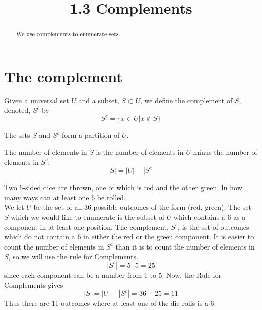 \documentclass[handout]{ximera}
\title{1.3 Complements}
\begin{document}
\begin{abstract}
We use complements to enumerate sets.
\end{abstract}

\maketitle

\section{The complement}



\begin{definition}[Complement]
Given a universal set $U$ and a subset, $S \subset U$, we define the complement of $S$, denoted, $S^c$ by
\[
S^c = \{x \in U | x \notin S \}
\]
\end{definition}

\begin{remark} The sets $S$ and $S^c$ form a partition of $U$.
\end{remark}
\begin{image}
\end{image}

\begin{proposition}
The number of elements in $S$ is the number of elements in $U$ minus the number of elements in $S^c$:
\[
|S| = |U| - |S^c|
\]
\end{proposition}



\begin{example}[example 1]
Two 6-sided dice are thrown, one of which is red and the other green.  
In how many ways can at least one 6 be rolled.\\
We let $U$ be the set of all 36 possible outcomes of the form (red, green).
The set $S$ which we would like to enumerate is the subset of $U$ which contains a 6 as a component in at least one position.
The complement, $S^c$, is the set of outcomes which do not contain a 6 in either the red or the green component. It is easier to count the number of elements in $S^c$ than it is to count the number of elements in $S$, so we will use the rule for Complements.
\[
|S^c| = 5 \cdot 5 = 25
\]
since each component can be a number from 1 to 5. Now, the Rule for Complements gives
\[
|S| = |U| - |S^c| = 36 - 25 = 11
\]
Thus there are 11 outcomes where at least one of the die rolls is a 6.
\end{example}
\end{document}
